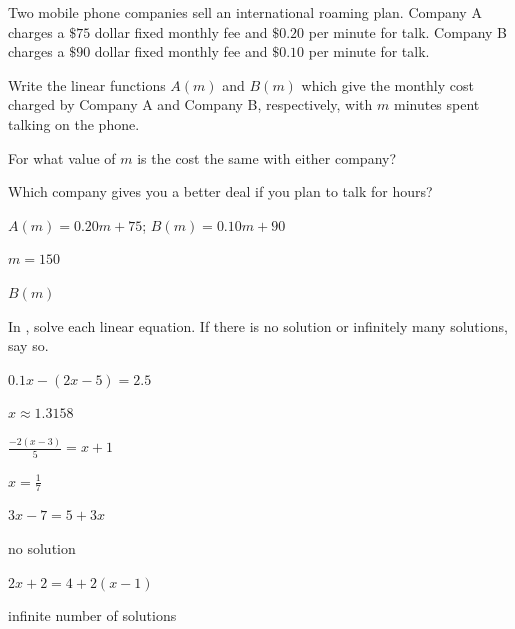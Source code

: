 \begin{exercise}
Two mobile phone companies sell an international roaming plan. Company A charges a $\$75$ dollar fixed monthly fee and $\$0.20$ per minute for talk. Company B charges a $\$90$ dollar fixed monthly fee and $\$0.10$ per minute for talk. 

\begin{parts}
\item Write the linear functions $A(m)$ and $B(m)$ which give the monthly cost charged by Company A and Company B, respectively, with $m$ minutes spent talking on the phone.

\item For what value of $m$ is the cost the same with either company?

\item Which company gives you a better deal if you plan to talk for hours?
\end{parts}

\end{exercise}


\begin{solution}
    \begin{parts}
        \item $A(m)=0.20m+75$; $B(m)=0.10m+90$
        \item $m=150$
        \item $B(m)$
    \end{parts}
\end{solution}







 In , solve each linear equation. If there is no solution or infinitely many solutions, say so.

\begin{exercise}\label{exercise-2.2.21}
$\displaystyle 0.1x-(2x-5)=2.5$
\end{exercise}

\begin{solution}
$x\approx1.3158$
\end{solution}




\begin{exercise}
$\displaystyle \frac{-2(x-3)}{5}=x+1$
\end{exercise}

\begin{solution}
$x=\frac{1}{7}$
\end{solution}



\begin{exercise}
$\displaystyle 3x-7=5+3x$
\end{exercise}

\begin{solution}
no solution
\end{solution}



\begin{exercise}\label{exercise-2.2.24}
$\displaystyle 2x+2=4+2(x-1)$
\end{exercise}

\begin{solution}
infinite number of solutions
\end{solution}